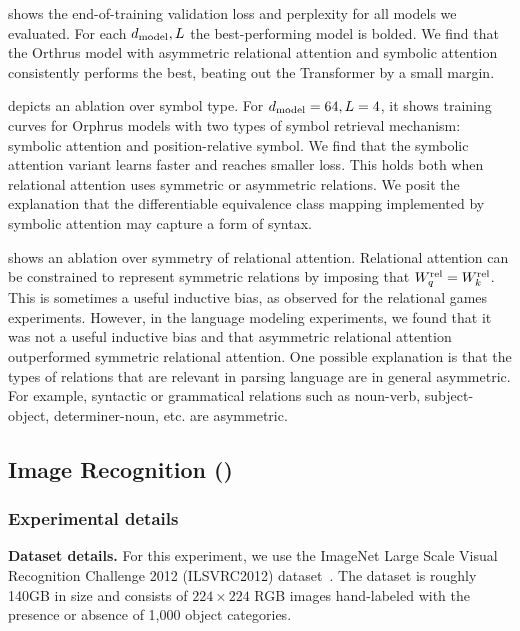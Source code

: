  shows the end-of-training validation loss and perplexity for all models we evaluated. For each $d_{\mathrm{model}}, L$ the best-performing model is bolded. We find that the Orthrus model with asymmetric relational attention and symbolic attention consistently performs the best, beating out the Transformer by a small margin.

 depicts an ablation over symbol type. For $d_{\mathrm{model}} = 64, L = 4$, it shows training curves for Orphrus models with two types of symbol retrieval mechanism: symbolic attention and position-relative symbol. We find that the symbolic attention variant learns faster and reaches smaller loss. This holds both when relational attention uses symmetric or asymmetric relations. We posit the explanation that the differentiable equivalence class mapping implemented by symbolic attention may capture a form of syntax.

 shows an ablation over symmetry of relational attention. Relational attention can be constrained to represent symmetric relations by imposing that $W_q^{\mathrm{rel}} = W_k^{\mathrm{rel}}$. This is sometimes a useful inductive bias, as observed for the relational games experiments. However, in the language modeling experiments, we found that it was not a useful inductive bias and that asymmetric relational attention outperformed symmetric relational attention. One possible explanation is that the types of relations that are relevant in parsing language are in general asymmetric. For example, syntactic or grammatical relations such as noun-verb, subject-object, determiner-noun, etc. are asymmetric.

\subsection{Image Recognition ()}

\subsubsection*{Experimental details}

\textbf{Dataset details.} For this experiment, we use the ImageNet Large Scale Visual Recognition Challenge 2012 (ILSVRC2012) dataset~\citep{imagenet}. The dataset is roughly 140GB in size and consists of $224 \times 224$ RGB images hand-labeled with the presence or absence of 1,000 object categories.

